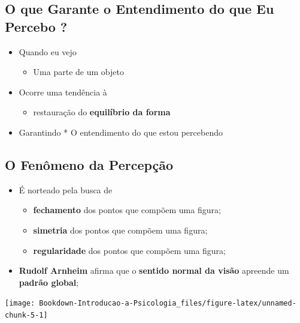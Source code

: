 \documentclass[
]{book}
\providecommand{\tightlist}{%
  \setlength{\itemsep}{0pt}\setlength{\parskip}{0pt}}
\begin{document}
\hypertarget{o-que-garante-o-entendimento-do-que-eu-percebo}{%
\subsection{O que Garante o Entendimento do que Eu Percebo ?}\label{o-que-garante-o-entendimento-do-que-eu-percebo}}

\begin{itemize}
\tightlist
\item
  Quando eu vejo

  \begin{itemize}
  \tightlist
  \item
    Uma parte de um objeto
  \end{itemize}
\item
  Ocorre uma tendência à

  \begin{itemize}
  \tightlist
  \item
    restauração do \textbf{equilíbrio da forma}
  \end{itemize}
\item
  Garantindo * O entendimento do que estou percebendo
\end{itemize}

\hypertarget{o-fenuxf4meno-da-percepuxe7uxe3o}{%
\subsection{O Fenômeno da Percepção}\label{o-fenuxf4meno-da-percepuxe7uxe3o}}

\begin{itemize}
\tightlist
\item
  É norteado pela busca de

  \begin{itemize}
  \tightlist
  \item
    \textbf{fechamento} dos pontos que compõem uma figura;
  \item
    \textbf{simetria} dos pontos que compõem uma figura;
  \item
    \textbf{regularidade} dos pontos que compõem uma figura;
  \end{itemize}
\item
  \textbf{Rudolf Arnheim} afirma que o \textbf{sentido normal da visão} apreende
  um \textbf{padrão global};
\end{itemize}

\texttt{[image: Bookdown-Introducao-a-Psicologia\_files/figure-latex/unnamed-chunk-5-1]}
\end{document}
